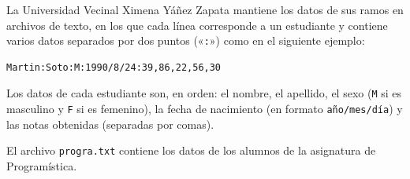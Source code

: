 \lstset{language=file,frame=single}

La Universidad Vecinal Ximena Yáñez Zapata
mantiene los datos de sus ramos en archivos de texto,
en los que cada línea corres\-ponde a un estudiante
y contiene varios datos separados por dos puntos («\verb+:+»)
como en el siguiente ejemplo:
\begin{verbatim}Martin:Soto:M:1990/8/24:39,86,22,56,30\end{verbatim}

Los datos de cada estudiante son, en orden:
el nombre, el ape\-llido,
el sexo (\verb+M+ si es masculino y \verb+F+ si es femenino),
la fecha de nacimiento (en formato \texttt{año/mes/día})
y las notas obtenidas (separadas por comas).

El archivo \texttt{progra.txt} contiene los datos
de los alumnos de la asignatura de Programística.

